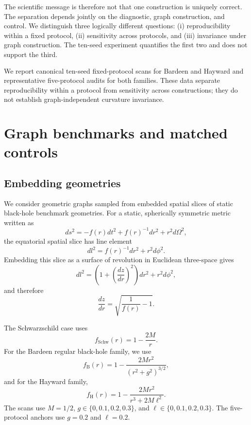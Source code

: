 \documentclass[11pt]{article}
\begin{document}
The scientific message is therefore not that one construction is uniquely
correct. The separation depends jointly on the diagnostic, graph construction,
and control. We distinguish three logically different questions:
(i) reproducibility within a fixed protocol, (ii) sensitivity across protocols,
and (iii) invariance under graph construction. The ten-seed experiment quantifies
the first two and does not support the third.

We report canonical ten-seed fixed-protocol scans for Bardeen and Hayward and
representative five-protocol audits for both families. These data separate
reproducibility within a protocol from sensitivity across constructions; they
do not establish graph-independent curvature invariance.

\section{Graph benchmarks and matched controls}

\subsection{Embedding geometries}

We consider geometric graphs sampled from embedded spatial slices of static
black-hole benchmark geometries. For a static, spherically symmetric metric
written as
\begin{equation}
    ds^2 = -f(r)dt^2 + f(r)^{-1}dr^2 + r^2d\Omega^2,
\end{equation}
the equatorial spatial slice has line element
\begin{equation}
    dl^2 = f(r)^{-1}dr^2 + r^2d\phi^2 .
\end{equation}
Embedding this slice as a surface of revolution in Euclidean three-space gives
\begin{equation}
    dl^2 =
    \left(1+\left(\frac{dz}{dr}\right)^2\right)dr^2+r^2d\phi^2,
\end{equation}
and therefore
\begin{equation}
    \frac{dz}{dr} =
    \sqrt{\frac{1}{f(r)}-1}.
\end{equation}

The Schwarzschild case uses
\begin{equation}
    f_{\mathrm{Schw}}(r) = 1-\frac{2M}{r}.
\end{equation}
For the Bardeen regular black-hole family, we use
\begin{equation}
    f_{\mathrm{B}}(r)
    =
    1-\frac{2Mr^2}{(r^2+g^2)^{3/2}},
\end{equation}
and for the Hayward family,
\begin{equation}
    f_{\mathrm{H}}(r)
    =
    1-\frac{2Mr^2}{r^3+2M\ell^2}.
\end{equation}
The scans use $M=1/2$, $g\in\{0,0.1,0.2,0.3\}$, and
$\ell\in\{0,0.1,0.2,0.3\}$. The five-protocol anchors use $g=0.2$ and
$\ell=0.2$.
\end{document}
